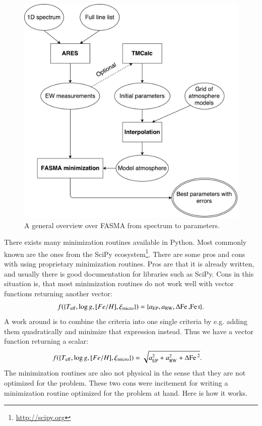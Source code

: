 \documentclass{aa}
\begin{document}
\begin{figure}[tpb]
    \centering
    \includegraphics[width=1.0\linewidth,natwidth=700,natheight=650]{figures/FASMA_general.pdf}
    \caption{A general overview over FASMA from spectrum to parameters.}
    \label{fig:FASMA_general}
\end{figure}

There exists many minimization routines available in Python. Most commonly known
are the ones from the SciPy ecosystem\footnote{\url{http://scipy.org}}. There
are some pros and cons with using proprietary minimization routines. Pros are
that it is already written, and usually there is good documentation for
libraries such as SciPy. Cons in this situation is, that most minimization
routines do not work well with vector functions returning another vector:
\begin{align}
    f(\{T_\mathrm{eff}, \log g, [Fe/H], \xi_\mathrm{micro}\}) = \{a_\mathrm{EP}, a_\mathrm{RW}, \Delta\ion{Fe}, \ion{Fe}{I}\}.
\end{align}
A work around is to combine the criteria into one single criteria by e.g. adding
them quadratically and minimize that expression instead. Thus we have a vector
function returning a scalar:
\begin{align}
    f(\{T_\mathrm{eff}, \log g, [Fe/H], \xi_\mathrm{micro}\}) &= \sqrt{a_\mathrm{EP}^2 + a_\mathrm{RW}^2 + \Delta\ion{Fe}{}^2}.
\end{align}
The minimization routines are also not physical in the sense that they are not
optimized for the problem. These two cons were incitement for writing a
minimization routine optimized for the problem at hand. Here is how it works.
\end{document}
